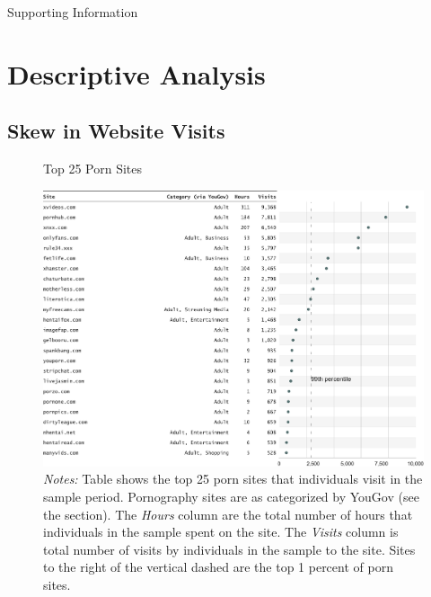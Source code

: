 \documentclass[12pt, letterpaper]{article}
\begin{document}
\appendix
\renewcommand{\thesection}{SI \arabic{section}}
\renewcommand\thetable{\thesection.\arabic{table}}  
\renewcommand\thefigure{\thesection.\arabic{figure}}
\begin{center}
\Large{Supporting Information}
\end{center}

\FloatBarrier
\section{Descriptive Analysis}

\subsection{Skew in Website Visits}
\begin{figure}[ht]
	\centering
	\caption{Top 25 Porn Sites}
	\includegraphics[width=\textwidth]{../figs/top_25_adultsites.pdf}
	\caption*{\footnotesize \emph{Notes:} 
		Table shows the top 25 porn sites that individuals visit in the sample period.
		Pornography sites are as categorized by YouGov (see the  section).
		The \emph{Hours} column are the total number of hours that individuals in the sample spent on the site. 
		The \emph{Visits} column is total number of visits by individuals in the sample to the site.  
		Sites to the right of the vertical dashed are the top 1 percent of porn sites.
	}
	\label{fig:top25_adult}
\end{figure}
\end{document}
